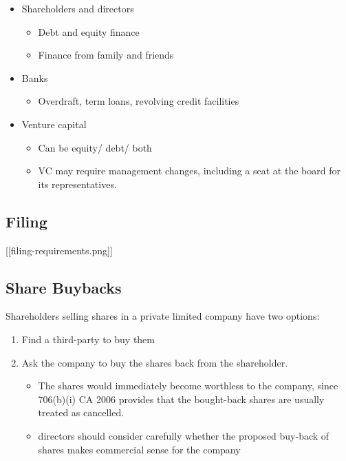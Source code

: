 \documentclass[
]{article}
\providecommand{\tightlist}{%
  \setlength{\itemsep}{0pt}\setlength{\parskip}{0pt}}
\begin{document}
\begin{itemize}
\tightlist
\item
  Shareholders and directors

  \begin{itemize}
  \tightlist
  \item
    Debt and equity finance
  \item
    Finance from family and friends
  \end{itemize}
\item
  Banks

  \begin{itemize}
  \tightlist
  \item
    Overdraft, term loans, revolving credit facilities
  \end{itemize}
\item
  Venture capital

  \begin{itemize}
  \tightlist
  \item
    Can be equity/ debt/ both
  \item
    VC may require management changes, including a seat at the board for
    its representatives.
  \end{itemize}
\end{itemize}

\hypertarget{filing}{%
\subsection{Filing}\label{filing}}

{[}{[}filing-requirements.png{]}{]}

\hypertarget{share-buybacks}{%
\subsection{Share Buybacks}\label{share-buybacks}}

Shareholders selling shares in a private limited company have two
options:

\begin{enumerate}
\def\labelenumi{\arabic{enumi}.}
\tightlist
\item
  Find a third-party to buy them
\item
  Ask the company to buy the shares back from the shareholder.

  \begin{itemize}
  \tightlist
  \item
    The shares would immediately become worthless to the company, since
    706(b)(i) CA 2006 provides that the bought-back shares are usually
    treated as cancelled.
  \item
    directors should consider carefully whether the proposed buy-back of
    shares makes commercial sense for the company
  \end{itemize}
\end{enumerate}
\end{document}
